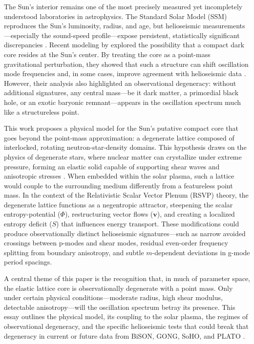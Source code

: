 \documentclass{article}
\begin{document}
The Sun’s interior remains one of the most precisely measured yet incompletely understood laboratories in astrophysics. The Standard Solar Model (SSM) reproduces the Sun’s luminosity, radius, and age, but helioseismic measurements---especially the sound-speed profile---expose persistent, statistically significant discrepancies \citep{buldgen2023}. Recent modeling by \citet{bellinger2025} explored the possibility that a compact dark core resides at the Sun’s center. By treating the core as a point-mass gravitational perturbation, they showed that such a structure can shift oscillation mode frequencies and, in some cases, improve agreement with helioseismic data \citep{aerts2010}. However, their analysis also highlighted an observational degeneracy: without additional signatures, any central mass---be it dark matter, a primordial black hole, or an exotic baryonic remnant---appears in the oscillation spectrum much like a structureless point.

This work proposes a physical model for the Sun’s putative compact core that goes beyond the point-mass approximation: a degenerate lattice composed of interlocked, rotating neutron-star-density domains. This hypothesis draws on the physics of degenerate stars, where nuclear matter can crystallize under extreme pressure, forming an elastic solid capable of supporting shear waves and anisotropic stresses \citep{markovic1995, kunitomo2021}. When embedded within the solar plasma, such a lattice would couple to the surrounding medium differently from a featureless point mass. In the context of the Relativistic Scalar Vector Plenum (RSVP) theory, the degenerate lattice functions as a negentropic attractor, steepening the scalar entropy-potential ($\Phi$), restructuring vector flows ($\mathbf{v}$), and creating a localized entropy deficit ($S$) that influences energy transport. These modifications could produce observationally distinct helioseismic signatures---such as narrow avoided crossings between p-modes and shear modes, residual even-order frequency splitting from boundary anisotropy, and subtle $m$-dependent deviations in g-mode period spacings.

A central theme of this paper is the recognition that, in much of parameter space, the elastic lattice core is observationally degenerate with a point mass. Only under certain physical conditions---moderate radius, high shear modulus, detectable anisotropy---will the oscillation spectrum betray its presence. This essay outlines the physical model, its coupling to the solar plasma, the regimes of observational degeneracy, and the specific helioseismic tests that could break that degeneracy in current or future data from BiSON, GONG, SoHO, and PLATO \citep{lund2017}.
\end{document}
